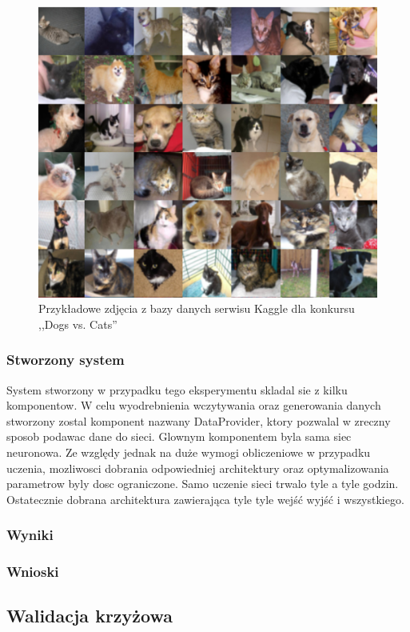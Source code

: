 \begin{figure}[ht!]
\centering
\includegraphics[scale=0.8]{res/catsdogs.png}
\caption[Caption for LOF]{Przykładowe zdjęcia z bazy danych serwisu Kaggle dla konkursu ,,Dogs vs. Cats'' \label{catsdogs}}
\end{figure} 

\subsubsection{Stworzony system}
System stworzony w przypadku tego eksperymentu skladal sie z kilku komponentow. W celu wyodrebnienia wczytywania oraz generowania danych stworzony zostal komponent nazwany DataProvider, ktory pozwalal w zreczny sposob podawac dane do sieci. Glownym komponentem byla sama siec neuronowa. Ze względy jednak na duże wymogi obliczeniowe w przypadku uczenia, mozliwosci dobrania odpowiedniej architektury oraz optymalizowania parametrow byly dosc ograniczone. Samo uczenie sieci trwalo tyle a tyle godzin. Ostatecznie dobrana architektura zawierająca tyle tyle wejść wyjść i wszystkiego. 
\subsubsection{Wyniki}
\subsubsection{Wnioski}

\subsection{Walidacja krzyżowa}
